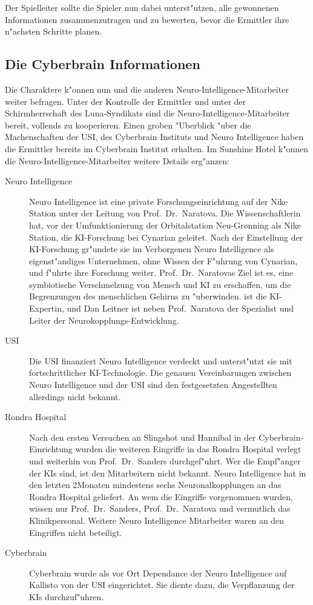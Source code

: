 Der Spielleiter sollte die Spieler nun dabei unterst"utzen, alle gewonnenen Informationen zusammenzutragen und zu bewerten, bevor die Ermittler ihre n"achsten Schritte planen.

\subsection{Die Cyberbrain Informationen} 
Die Charaktere k"onnen nun \ml{} und die anderen Neuro-Intelligence-Mitarbeiter weiter befragen. Unter der Kontrolle der Ermittler und unter der Schirmherrschaft des Luna-Syndikats sind die Neuro-Intelligence-Mitarbeiter bereit, vollends zu kooperieren. Einen groben "Uberblick "uber die Machenschaften der USI, des Cyberbrain Instituts und Neuro Intelligence haben die Ermittler bereits im Cyberbrain Institut erhalten. Im Sunshine Hotel k"onnen die Neuro-Intelligence-Mitarbeiter weitere Details erg"anzen:

\begin{description}
	\item[Neuro Intelligence] Neuro Intelligence ist eine private Forschungseinrichtung auf der Nike Station unter der Leitung von 
		Prof.~Dr.~Naratova. Die Wissenschaftlerin hat, vor der Umfunktionierung der Orbitalstation Neu-Gr{\o}nning als Nike Station, die KI-Forschung bei Cynarian geleitet. Nach der Einstellung der KI-Forschung gr"undete sie im Verborgenen Neuro Intelligence als eigenst"andiges Unternehmen, ohne Wissen der F"uhrung von Cynarian, und f"uhrte ihre Forschung weiter. Prof.~Dr.~Naratovas Ziel ist es, eine symbiotische Verschmelzung von Mensch und KI zu erschaffen, um die Begrenzungen des menschlichen Gehirns zu "uberwinden. \ml{} ist die KI-Expertin, und Dan Leitner ist neben Prof.~Naratova der Spezialist und Leiter der Neurokopplungs-Entwicklung.
	\item[USI] Die USI finanziert Neuro Intelligence verdeckt und unterst"utzt sie mit fortschrittlicher KI-Technologie. Die genauen 
		Vereinbarungen zwischen Neuro Intelligence und der USI sind den festgesetzten Angestellten allerdings nicht bekannt.		
	\item[Rondra Hospital] Nach den ersten Versuchen an Slingshot und Hannibal in der Cyberbrain-Einrichtung wurden die weiteren Eingriffe 	
		in das Rondra Hospital verlegt und weiterhin von Prof.~Dr.~Sanders durchgef"uhrt. Wer die Empf"anger der KIs sind, ist den Mitarbeitern nicht bekannt. Neuro Intelligence hat in den letzten 2\half Monaten mindestens sechs Neuronalkopplungen an das Rondra Hospital geliefert. An wem die Eingriffe vorgenommen wurden, wissen nur Prof.~Dr.~Sanders, Prof.~Dr.~Naratova und vermutlich das Klinikpersonal. Weitere Neuro Intelligence Mitarbeiter waren an den Eingriffen nicht beteiligt.		
	\item[Cyberbrain] Cyberbrain wurde als vor Ort Dependance der Neuro Intelligence auf Kallisto von der USI eingerichtet. Sie diente 		
		dazu, die Verpflanzung der KIs durchzuf"uhren.
\end{description}	

